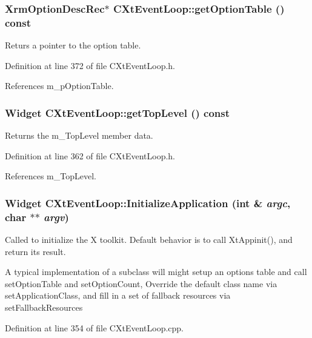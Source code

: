 \subsubsection{\setlength{\rightskip}{0pt plus 5cm}Xrm\-Option\-Desc\-Rec$\ast$ CXt\-Event\-Loop::get\-Option\-Table () const\hspace{0.3cm}{\tt  [inline]}}\label{classCXtEventLoop_a4}


Returs a pointer to the option table.



Definition at line 372 of file CXt\-Event\-Loop.h.

References m\_\-p\-Option\-Table.
\subsubsection{\setlength{\rightskip}{0pt plus 5cm}Widget CXt\-Event\-Loop::get\-Top\-Level () const\hspace{0.3cm}{\tt  [inline]}}\label{classCXtEventLoop_a2}


Returns the m\_\-Top\-Level member data.



Definition at line 362 of file CXt\-Event\-Loop.h.

References m\_\-Top\-Level.
\subsubsection{\setlength{\rightskip}{0pt plus 5cm}Widget CXt\-Event\-Loop::Initialize\-Application (int \& {\em argc}, char $\ast$$\ast$ {\em argv})\hspace{0.3cm}{\tt  [protected, virtual]}}\label{classCXtEventLoop_b6}


Called to initialize the X toolkit. Default behavior is to call Xt\-Appinit(), and return its result.

A typical implementation of a subclass will might setup an options table and call set\-Option\-Table and set\-Option\-Count, Override the default class name via set\-Application\-Class, and  fill in a set of fallback resources via set\-Fallback\-Resources 

Definition at line 354 of file CXt\-Event\-Loop.cpp.

